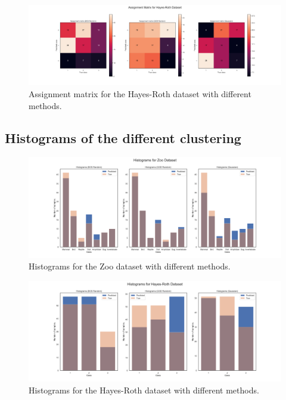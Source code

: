\begin{figure}[H]
    \centering
    \includegraphics[width=\linewidth]{python_figures/assignment_matrix_hayes-roth.png}
    \caption{Assignment matrix for the Hayes-Roth dataset with different methods.}
    \label{fig:assign_hr}
\end{figure}

\subsection*{Histograms of the different clustering}
\label{sec:appendix_hist}

\begin{figure}[H]
    \centering
    \includegraphics[width=\linewidth]{python_figures/histograms_zoo.png}
    \caption{Histograms for the Zoo dataset with different methods.}
    \label{fig:hist_zoo}
\end{figure}

\begin{figure}[H]
    \centering
    \includegraphics[width=\linewidth]{python_figures/histograms_hayes-roth.png}
    \caption{Histograms for the Hayes-Roth dataset with different methods.}
    \label{fig:hist_hr}
\end{figure}
